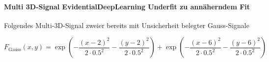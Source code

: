 \begin{otherlanguage}{ngerman}












\paragraph{Multi 3D-Signal \gls{EvidentialDeepLearning} Underfit zu annäherndem Fit} 

Folgendes Multi-3D-Signal zweier bereits mit Unsicherheit belegter Gauss-Signale 

\[
F_{\text{Gauss}}(x, y) =
\exp\!\left( -\frac{(x - 2)^2}{2 \cdot 0.5^2} - \frac{(y - 2)^2}{2 \cdot 0.5^2} \right)
+ \exp\!\left( -\frac{(x - 6)^2}{2 \cdot 0.5^2} - \frac{(y - 6)^2}{2 \cdot 0.5^2} \right)
\]


\end{otherlanguage}
